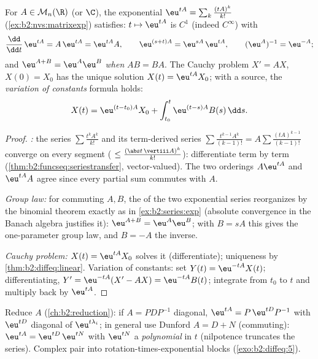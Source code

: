 \begin{theorem}\label{thm:b2:diffeq:matrixexp}
For $A \in \mathcal{M}_n(\R)$ (or $\C$), the exponential $\eu^{tA}
= \sum_k \frac{(tA)^k}{k!}$ (\cref{ex:b2:nvs:matrixexp}) satisfies:
$t \mapsto \eu^{tA}$ is $C^1$ (indeed $C^\infty$)
with
\[
\frac{\dd}{\dd t}\,\eu^{tA} = A\,\eu^{tA} = \eu^{tA}A ,
\qquad
\eu^{(s+t)A} = \eu^{sA}\,\eu^{tA},
\qquad
(\eu^{A})^{-1} = \eu^{-A} ;
\]
and $\eu^{A + B} = \eu^A\eu^B$ \emph{when} $AB = BA$. The Cauchy
problem $X' = AX$, $X(0) = X_0$ has the unique solution $X(t) =
\eu^{tA}X_0$; with a source, the \emph{variation of constants}
formula holds:
\[
X(t) = \eu^{(t - t_0)A}X_0 + \int_{t_0}^{t} \eu^{(t-s)A}B(s)\,\dd
s .
\]
\end{theorem}

\begin{proof}
\emph{:} the series $\sum \frac{t^kA^k}{k!}$ and
its term-derived series $\sum \frac{t^{k-1}A^k}{(k-1)!} = A\sum
\frac{(tA)^{k-1}}{(k-1)!}$ converge  on every segment
( $\leq \frac{(\abs t\,\vertiii A)^k}{k!}$): differentiate
term by term (\cref{thm:b2:funcseq:seriestransfer}, vector-valued).
The two orderings $A\eu^{tA}$ and $\eu^{tA}A$ agree since every
partial sum commutes with $A$.

\emph{Group law:} for commuting $A, B$, the  of the
two exponential series reorganizes by the binomial theorem exactly
as in \cref{ex:b2:series:exp} (absolute convergence in the Banach
algebra justifies it): $\eu^{A+B} = \eu^A\eu^B$; with $B = sA$ this
gives the one-parameter group law, and $B = -A$ the inverse.

\emph{Cauchy problem:} $X(t) = \eu^{tA}X_0$ solves it (differentiate);
uniqueness by \cref{thm:b2:diffeq:linear}. Variation of constants:
set $Y(t) = \eu^{-tA}X(t)$; differentiating, $Y' = \eu^{-tA}(X' -
AX) = \eu^{-tA}B(t)$; integrate from $t_0$ to $t$ and multiply
back by $\eu^{tA}$.
\end{proof}

\begin{method}[Computing $\eu^{tA}$]\label{met:b2:diffeq:computeexp}
Reduce $A$ (\cref{ch:b2:reduction}): if $A = PDP^{-1}$ diagonal,
$\eu^{tA} = P\,\eu^{tD}P^{-1}$ with $\eu^{tD}$ diagonal of
$\eu^{t\lambda_i}$; in general use Dunford $A = D + N$
(commuting): $\eu^{tA} = \eu^{tD}\,\eu^{tN}$ with $\eu^{tN}$ a
\emph{polynomial} in $t$ (nilpotence truncates the series). Complex
 pair into rotation-times-exponential blocks
(\cref{exo:b2:diffeq:5}).
\end{method}


